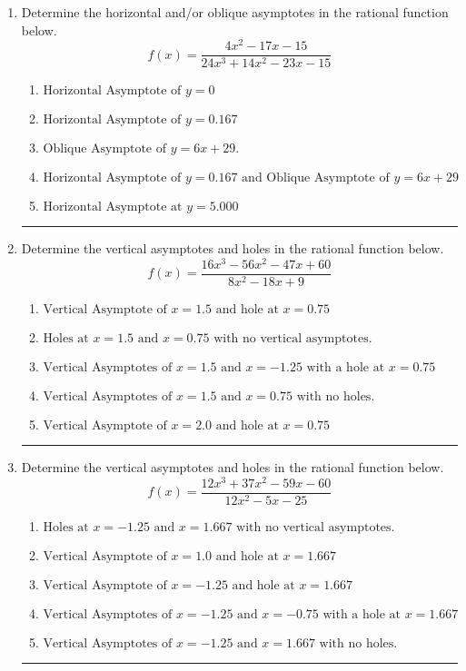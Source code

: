 \documentclass[14pt]{extbook}
\newcommand{\litem}[1]{\item#1\hspace*{-1cm}\rule{\textwidth}{0.4pt}}
\begin{document}
\begin{enumerate}
{\begin{enumerate}[label=\Alph*.]
\end{enumerate} }
\litem{
Determine the horizontal and/or oblique asymptotes in the rational function below.\[ f(x) = \frac{4x^{2} -17 x -15}{24x^{3} +14 x^{2} -23 x -15} \]\begin{enumerate}[label=\Alph*.]
\item \( \text{Horizontal Asymptote of } y = 0 \)
\item \( \text{Horizontal Asymptote of } y = 0.167  \)
\item \( \text{Oblique Asymptote of } y = 6x + 29. \)
\item \( \text{Horizontal Asymptote of } y = 0.167 \text{ and Oblique Asymptote of } y = 6x + 29 \)
\item \( \text{Horizontal Asymptote at } y = 5.000 \)

\end{enumerate} }
\litem{
Determine the vertical asymptotes and holes in the rational function below.\[ f(x) = \frac{16x^{3} -56 x^{2} -47 x + 60}{8x^{2} -18 x + 9} \]\begin{enumerate}[label=\Alph*.]
\item \( \text{Vertical Asymptote of } x = 1.5 \text{ and hole at } x = 0.75 \)
\item \( \text{Holes at } x = 1.5 \text{ and } x = 0.75 \text{ with no vertical asymptotes.} \)
\item \( \text{Vertical Asymptotes of } x = 1.5 \text{ and } x = -1.25 \text{ with a hole at } x = 0.75 \)
\item \( \text{Vertical Asymptotes of } x = 1.5 \text{ and } x = 0.75 \text{ with no holes.} \)
\item \( \text{Vertical Asymptote of } x = 2.0 \text{ and hole at } x = 0.75 \)

\end{enumerate} }
\litem{
Determine the vertical asymptotes and holes in the rational function below.\[ f(x) = \frac{12x^{3} +37 x^{2} -59 x -60}{12x^{2} -5 x -25} \]\begin{enumerate}[label=\Alph*.]
\item \( \text{Holes at } x = -1.25 \text{ and } x = 1.667 \text{ with no vertical asymptotes.} \)
\item \( \text{Vertical Asymptote of } x = 1.0 \text{ and hole at } x = 1.667 \)
\item \( \text{Vertical Asymptote of } x = -1.25 \text{ and hole at } x = 1.667 \)
\item \( \text{Vertical Asymptotes of } x = -1.25 \text{ and } x = -0.75 \text{ with a hole at } x = 1.667 \)
\item \( \text{Vertical Asymptotes of } x = -1.25 \text{ and } x = 1.667 \text{ with no holes.} \)


\end{enumerate}}
\end{enumerate}
\end{document}
